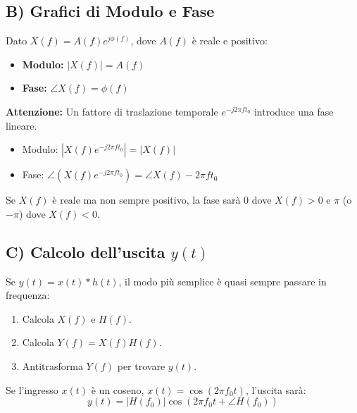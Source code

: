 \subsection{B) Grafici di Modulo e Fase}
Dato $X(f) = A(f) e^{j\phi(f)}$, dove $A(f)$ è reale e positivo:
\begin{itemize}
    \item \textbf{Modulo:} $|X(f)| = A(f)$
    \item \textbf{Fase:} $\angle X(f) = \phi(f)$
\end{itemize}
\textbf{Attenzione:} Un fattore di traslazione temporale $e^{-j2\pi f t_0}$ introduce una fase lineare.
\begin{itemize}
    \item Modulo: $|X(f)e^{-j2\pi f t_0}| = |X(f)|$
    \item Fase: $\angle (X(f)e^{-j2\pi f t_0}) = \angle X(f) - 2\pi f t_0$
\end{itemize}
Se $X(f)$ è reale ma non sempre positivo, la fase sarà $0$ dove $X(f) > 0$ e $\pi$ (o $-\pi$) dove $X(f) < 0$.

\subsection{C) Calcolo dell'uscita $y(t)$}
Se $y(t) = x(t) * h(t)$, il modo più semplice è quasi sempre passare in frequenza:
\begin{enumerate}
    \item Calcola $X(f)$ e $H(f)$.
    \item Calcola $Y(f) = X(f)H(f)$.
    \item Antitrasforma $Y(f)$ per trovare $y(t)$.
\end{enumerate}
Se l'ingresso $x(t)$ è un coseno, $x(t) = \cos(2\pi f_0 t)$, l'uscita sarà:
$$ y(t) = |H(f_0)| \cos(2\pi f_0 t + \angle H(f_0)) $$